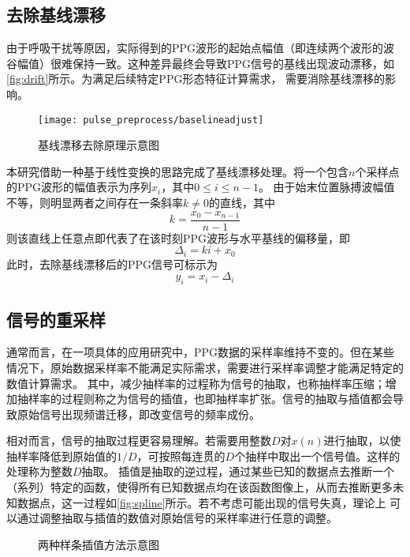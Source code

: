 \subsection{去除基线漂移}
由于呼吸干扰等原因，实际得到的PPG波形的起始点幅值（即连续两个波形的波谷幅值）很难保持一致。这种差异最终会导致PPG信号的基线出现波动漂移，如\autoref{fig:drift}所示。为满足后续特定PPG形态特征计算需求，
需要消除基线漂移的影响。
\begin{figure}[htbp]
    \centering
    \texttt{[image: pulse\_preprocess/baselineadjust]}
    \caption{\label{fig:drift}基线漂移去除原理示意图}
\end{figure}

本研究借助一种基于线性变换的思路完成了基线漂移处理。将一个包含$n$个采样点的PPG波形的幅值表示为序列$x_i$，其中$0 \le i \le n-1$。
由于始末位置脉搏波幅值不等，则明显两者之间存在一条斜率$k \ne 0$的直线，其中
\begin{equation}
    \label{equ:linek}
    k=\frac{x_0-x_{n-1}}{n-1}
\end{equation}
则该直线上任意点即代表了在该时刻PPG波形与水平基线的偏移量，即
\begin{equation}
    \label{equ:liney}
    \Delta_i=ki+x_0
\end{equation}
此时，去除基线漂移后的PPG信号可标示为
\begin{equation}
    \label{equ:adjusta}
    y_i=x_i-\Delta_i
\end{equation}

\subsection{信号的重采样}
通常而言，在一项具体的应用研究中，PPG数据的采样率维持不变的。但在某些情况下，原始数据采样率不能满足实际需求，需要进行采样率调整才能满足特定的数值计算需求。
其中，减少抽样率的过程称为信号的抽取，也称抽样率压缩；增加抽样率的过程则称之为信号的插值，也即抽样率扩张\cite{Cheng2008}。信号的抽取与插值都会导致原始信号出现频谱迁移，即改变信号的频率成份\cite{Cheng2008}。

相对而言，信号的抽取过程更容易理解。若需要用整数$D$对$x(n)$进行抽取，以使抽样率降低到原始值的$1/D$，可按照每连贯的$D$个抽样中取出一个信号值。这样的处理称为整数$D$抽取\cite{Cheng2008}。
插值是抽取的逆过程，通过某些已知的数据点去推断一个（系列）特定的函数，使得所有已知数据点均在该函数图像上，从而去推断更多未知数据点，这一过程如\autoref{fig:spline}所示。若不考虑可能出现的信号失真，理论上
可以通过调整抽取与插值的数值对原始信号的采样率进行任意的调整。
\begin{figure}[htbp]
    \centering
    \quad
    \caption{\label{fig:spline}两种样条插值方法示意图}
\end{figure}

